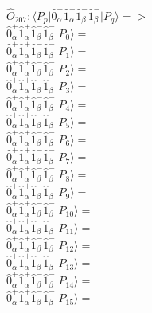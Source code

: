 \documentclass[14pt]{article}
\begin{document}
    $\hat{O}_{207}:  \langle{P_p}\vert \hat{0}_{\alpha}^{+}\hat{1}_{\alpha}^{+}\hat{1}_{\beta}^{-}\hat{1}_{\beta}^{-} \vert{P_q}\rangle => $ \\ 
    $ \hat{0}_{\alpha}^{+}\hat{1}_{\alpha}^{+}\hat{1}_{\beta}^{-}\hat{1}_{\beta}^{-} \vert{P_{0}}\rangle =  $ \\ 
    $ \hat{0}_{\alpha}^{+}\hat{1}_{\alpha}^{+}\hat{1}_{\beta}^{-}\hat{1}_{\beta}^{-} \vert{P_{1}}\rangle =  $ \\ 
    $ \hat{0}_{\alpha}^{+}\hat{1}_{\alpha}^{+}\hat{1}_{\beta}^{-}\hat{1}_{\beta}^{-} \vert{P_{2}}\rangle =  $ \\ 
    $ \hat{0}_{\alpha}^{+}\hat{1}_{\alpha}^{+}\hat{1}_{\beta}^{-}\hat{1}_{\beta}^{-} \vert{P_{3}}\rangle =  $ \\ 
    $ \hat{0}_{\alpha}^{+}\hat{1}_{\alpha}^{+}\hat{1}_{\beta}^{-}\hat{1}_{\beta}^{-} \vert{P_{4}}\rangle =  $ \\ 
    $ \hat{0}_{\alpha}^{+}\hat{1}_{\alpha}^{+}\hat{1}_{\beta}^{-}\hat{1}_{\beta}^{-} \vert{P_{5}}\rangle =  $ \\ 
    $ \hat{0}_{\alpha}^{+}\hat{1}_{\alpha}^{+}\hat{1}_{\beta}^{-}\hat{1}_{\beta}^{-} \vert{P_{6}}\rangle =  $ \\ 
    $ \hat{0}_{\alpha}^{+}\hat{1}_{\alpha}^{+}\hat{1}_{\beta}^{-}\hat{1}_{\beta}^{-} \vert{P_{7}}\rangle =  $ \\ 
    $ \hat{0}_{\alpha}^{+}\hat{1}_{\alpha}^{+}\hat{1}_{\beta}^{-}\hat{1}_{\beta}^{-} \vert{P_{8}}\rangle =  $ \\ 
    $ \hat{0}_{\alpha}^{+}\hat{1}_{\alpha}^{+}\hat{1}_{\beta}^{-}\hat{1}_{\beta}^{-} \vert{P_{9}}\rangle =  $ \\ 
    $ \hat{0}_{\alpha}^{+}\hat{1}_{\alpha}^{+}\hat{1}_{\beta}^{-}\hat{1}_{\beta}^{-} \vert{P_{10}}\rangle =  $ \\ 
    $ \hat{0}_{\alpha}^{+}\hat{1}_{\alpha}^{+}\hat{1}_{\beta}^{-}\hat{1}_{\beta}^{-} \vert{P_{11}}\rangle =  $ \\ 
    $ \hat{0}_{\alpha}^{+}\hat{1}_{\alpha}^{+}\hat{1}_{\beta}^{-}\hat{1}_{\beta}^{-} \vert{P_{12}}\rangle =  $ \\ 
    $ \hat{0}_{\alpha}^{+}\hat{1}_{\alpha}^{+}\hat{1}_{\beta}^{-}\hat{1}_{\beta}^{-} \vert{P_{13}}\rangle =  $ \\ 
    $ \hat{0}_{\alpha}^{+}\hat{1}_{\alpha}^{+}\hat{1}_{\beta}^{-}\hat{1}_{\beta}^{-} \vert{P_{14}}\rangle =  $ \\ 
    $ \hat{0}_{\alpha}^{+}\hat{1}_{\alpha}^{+}\hat{1}_{\beta}^{-}\hat{1}_{\beta}^{-} \vert{P_{15}}\rangle =  $ \\ 
    
\end{document}
